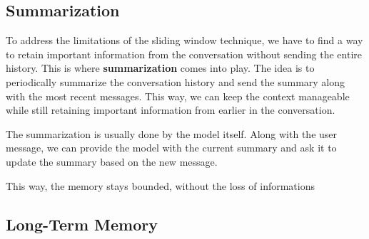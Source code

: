 \subsection{Summarization}
To address the limitations of the sliding window technique, we have to find a way to retain important information from the conversation without sending the entire history.
This is where \textbf{summarization} comes into play.
The idea is to periodically summarize the conversation history and send the summary along with the most recent messages. 
This way, we can keep the context manageable while still retaining important information from earlier in the conversation.

The summarization is usually done by the model itself. Along with the user message,
we can provide the model with the current summary and ask it to update the summary based on the new message.

This way, the memory stays bounded, without the loss of informations

\subsection{Long-Term Memory}